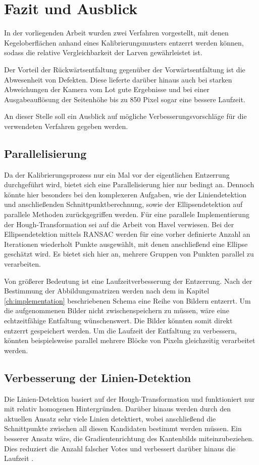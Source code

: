 \chapter{Fazit und Ausblick}
\label{ch:summary}
In der vorliegenden Arbeit wurden zwei Verfahren vorgestellt, mit denen Kegeloberflächen anhand eines Kalibrierungsmusters entzerrt werden können, sodass die relative Vergleichbarkeit der Larven gewährleistet ist.

Der Vorteil der Rückwärtsentfaltung gegenüber der Vorwärtsentfaltung ist die Abwesenheit von Defekten. Diese lieferte darüber hinaus auch bei starken Abweichungen der Kamera vom Lot gute Ergebnisse und bei einer Ausgabeauflösung der Seitenhöhe bis zu 850 Pixel sogar eine bessere Laufzeit.

An dieser Stelle soll ein Ausblick auf mögliche Verbesserungsvorschläge für die verwendeten Verfahren gegeben werden.

\section{Parallelisierung}
Da der Kalibrierungsprozess nur ein Mal vor der eigentlichen Entzerrung durchgeführt wird, bietet sich eine Parallelisierung hier nur bedingt an.
Dennoch könnte hier besonders bei den komplexeren Aufgaben, wie der Liniendetektion und anschließenden Schnittpunktberechnung, sowie der Ellipsendetektion auf parallele Methoden zurückgegriffen werden.
Für eine parallele Implementierung der Hough-Transformation sei auf die Arbeit von Havel \cite{Havel2014} verwiesen.
Bei der Ellipsendetektion mittels RANSAC werden für eine vorher definierte Anzahl an Iterationen wiederholt Punkte ausgewählt, mit denen anschließend eine Ellipse geschätzt wird. Es bietet sich hier an, mehrere Gruppen von Punkten parallel zu verarbeiten.

Von größerer Bedeutung ist eine Laufzeitverbesserung der Entzerrung. Nach der Bestimmung der Abbildungsmatrizen werden nach dem in Kapitel \ref{ch:implementation} beschriebenen Schema eine Reihe von Bildern entzerrt. Um die aufgenommenen Bilder nicht zwischenspeichern zu müssen, wäre eine echtzeitfähige Entfaltung wünschenswert. Die Bilder könnten somit direkt entzerrt gespeichert werden.  Um die Laufzeit der Entfaltung zu verbessern, könnten beispielsweise parallel mehrere Blöcke von Pixeln gleichzeitig verarbeitet werden.


\section{Verbesserung der Linien-Detektion}
Die Linien-Detektion basiert auf der Hough-Transformation und funktioniert nur mit relativ homogenen Hintergründen. Darüber hinaus werden durch den aktuellen Ansatz sehr viele Linien detektiert, wobei anschließend die Schnittpunkte zwischen all diesen Kandidaten bestimmt werden müssen. Ein besserer Ansatz wäre, die Gradientenrichtung des Kantenbilds miteinzubeziehen. Dies reduziert die Anzahl falscher Votes und verbessert darüber hinaus die Laufzeit \cite{Gorman1976}.


